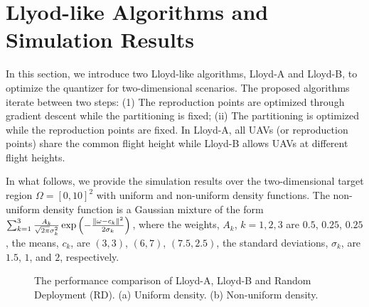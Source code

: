 \documentclass[12pt,onecolumn,journal,draftclsnofoot,letterpaper]{IEEEtran}
\begin{document}
\section{Llyod-like Algorithms and Simulation Results}
%
In this section, we introduce two Lloyd-like algorithms, Lloyd-A and Lloyd-B, to optimize the quantizer for
two-dimensional scenarios. The proposed
algorithms iterate between two steps: (1) The reproduction points are optimized through gradient descent while the
partitioning is fixed; (ii) The partitioning is optimized while the reproduction points are fixed.  In Lloyd-A, all UAVs
(or reproduction points) share the common flight height while Lloyd-B allows UAVs at different flight heights.

In what follows, we provide the simulation results over the two-dimensional target region $\Omega=[0,10]^2$ with
uniform and non-uniform density functions.  The non-uniform density function is a Gaussian mixture of the form
$\sum_{k=1}^{3}\frac{A_k}{\sqrt{2\pi}\sigma^2_k}\exp{\left(-\frac{\|\ensuremath{\omega}-c_k\|^2}{2\sigma_k}\right)}$, where the
weights, $A_k$, $k=1,2,3$ are $0.5$, $0.25$, $0.25$, the means, $c_k$, are $(3,3)$, $(6,7)$, $(7.5,2.5)$, the standard deviations,
$\sigma_k$, are  $1.5$, $1$, and $2$, respectively.


\begin{figure}[!htb]
\setlength\abovecaptionskip{0pt}
\setlength\belowcaptionskip{0pt}
\centering
{}
\hfil
{}
\captionsetup{justification=justified}
\caption{\small{The performance comparison of Lloyd-A, Lloyd-B and Random Deployment (RD). 
(a) Uniform density. (b) Non-uniform density.}}
\label{Distortion}
\end{figure}
\end{document}
